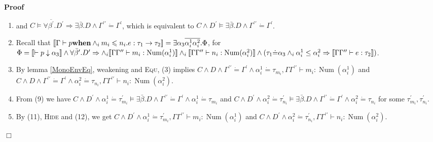 \documentclass{article}
\newcommand{\tmname}[1]{\textsc{#1}}
\newcommand{\tmop}[1]{\ensuremath{\operatorname{#1}}}
\newcommand{\tmstrong}[1]{\textbf{#1}}
\newenvironment{proof}{\noindent\textbf{Proof\ }}{\hspace*{\fill}$\Box$\medskip}
\begin{document}
\begin{proof}
\begin{itemize}
\begin{enumerate}
      \item and $C \vDash \forall \overline{\beta^{\prime}} .D^{\prime}
      \Rightarrow \exists \bar{\beta} .D \wedge \Gamma^{\prime\prime} \dot{=}
      \Gamma^{\prime}$, which is equivalent to $C \wedge D^{\prime} \vDash
      \exists \bar{\beta} .D \wedge \Gamma^{\prime\prime} \dot{=}
      \Gamma^{\prime}$.
      
      \item Recall that $\left\llbracket \Gamma \vdash p
      \text{{\tmstrong{when}}} \wedge_i m_i \leqslant n_i .e : \tau_1
      \rightarrow \tau_2 \right\rrbracket = \exists \alpha_3
      \overline{\alpha^1_i \alpha^2_i} . \Phi$, for $\Phi = \\
      \llbracket \vdash p \downarrow \alpha_3 \rrbracket \wedge \forall
      \bar{\beta}^{\prime} .D^{\prime} \Rightarrow \wedge_i \llbracket \Gamma
      \Gamma^{\prime\prime} \vdash m_i : \tmop{Num} (\alpha^1_i) \rrbracket
      \wedge_i \llbracket \Gamma \Gamma^{\prime\prime} \vdash n_i : \tmop{Num}
      (\alpha^2_i) \rrbracket \wedge \\
      (\tau_1 \dot{=} \alpha_3 \wedge_i \alpha^1_i \leq \alpha^2_i
      \Rightarrow \llbracket \Gamma \Gamma^{\prime\prime} \vdash e : \tau_2
      \rrbracket)$.
      
      \item By lemma \ref{MonoEnvEq}, weakening and {\tmname{Equ}}, (3)
      implies $C \wedge D \wedge \Gamma^{\prime\prime} \dot{=} \Gamma^{\prime}
      \wedge \alpha^1_i \dot{=} \tau_{m_i}, \Gamma \Gamma^{\prime\prime}
      \vdash m_i : \tmop{Num} (\alpha^1_i)$ and $C \wedge D \wedge
      \Gamma^{\prime\prime} \dot{=} \Gamma^{\prime} \wedge \alpha^2_i \dot{=}
      \tau_{n_i}, \Gamma \Gamma^{\prime\prime} \vdash n_i : \tmop{Num}
      (\alpha^2_i)$.
      
      \item From (9) we have $C \wedge D^{\prime} \wedge \alpha^1_i \dot{=}
      \tau_{m_i}^{\prime} \vDash \exists \bar{\beta} .D \wedge
      \Gamma^{\prime\prime} \dot{=} \Gamma^{\prime} \wedge \alpha^1_i \dot{=}
      \tau_{m_i}$ and $C \wedge D^{\prime} \wedge \alpha^2_i \dot{=}
      \tau_{n_i}^{\prime} \vDash \exists \bar{\beta} .D \wedge
      \Gamma^{\prime\prime} \dot{=} \Gamma^{\prime} \wedge \alpha^2_i \dot{=}
      \tau_{n_i}$ for some $\tau_{m_i}^{\prime}, \tau_{n_i}^{\prime}$.
      
      \item By (11), {\tmname{Hide}} and (12), we get $C \wedge D^{\prime}
      \wedge \alpha^1_i \dot{=} \tau_{m_i}^{\prime}, \Gamma
      \Gamma^{\prime\prime} \vdash m_i : \tmop{Num} (\alpha^1_i)$ and $C
      \wedge D^{\prime} \wedge \alpha^2_i \dot{=} \tau_{n_i}^{\prime}, \Gamma
      \Gamma^{\prime\prime} \vdash n_i : \tmop{Num} (\alpha^2_i)$.
      

\end{enumerate}
\end{itemize}
\end{proof}
\end{document}
